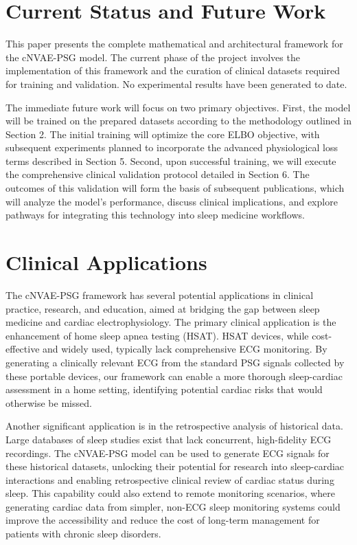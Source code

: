 \documentclass[10pt, conference]{IEEEtran}
\begin{document}
\section{Current Status and Future Work}

This paper presents the complete mathematical and architectural framework for the cNVAE-PSG model. The current phase of the project involves the implementation of this framework and the curation of clinical datasets required for training and validation. No experimental results have been generated to date.

The immediate future work will focus on two primary objectives. First, the model will be trained on the prepared datasets according to the methodology outlined in Section 2. The initial training will optimize the core ELBO objective, with subsequent experiments planned to incorporate the advanced physiological loss terms described in Section 5. Second, upon successful training, we will execute the comprehensive clinical validation protocol detailed in Section 6. The outcomes of this validation will form the basis of subsequent publications, which will analyze the model's performance, discuss clinical implications, and explore pathways for integrating this technology into sleep medicine workflows.

\section{Clinical Applications}

The cNVAE-PSG framework has several potential applications in clinical practice, research, and education, aimed at bridging the gap between sleep medicine and cardiac electrophysiology. The primary clinical application is the enhancement of home sleep apnea testing (HSAT). HSAT devices, while cost-effective and widely used, typically lack comprehensive ECG monitoring. By generating a clinically relevant ECG from the standard PSG signals collected by these portable devices, our framework can enable a more thorough sleep-cardiac assessment in a home setting, identifying potential cardiac risks that would otherwise be missed.

Another significant application is in the retrospective analysis of historical data. Large databases of sleep studies exist that lack concurrent, high-fidelity ECG recordings. The cNVAE-PSG model can be used to generate ECG signals for these historical datasets, unlocking their potential for research into sleep-cardiac interactions and enabling retrospective clinical review of cardiac status during sleep. This capability could also extend to remote monitoring scenarios, where generating cardiac data from simpler, non-ECG sleep monitoring systems could improve the accessibility and reduce the cost of long-term management for patients with chronic sleep disorders.
\end{document}
